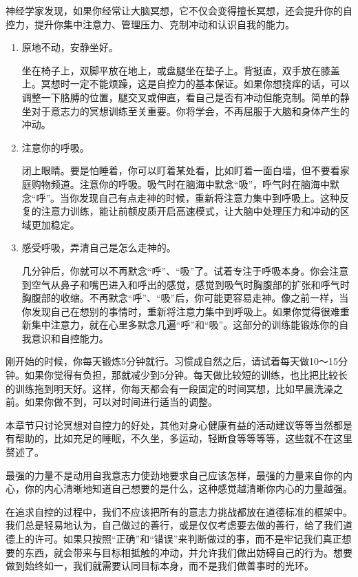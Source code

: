 \documentclass[12pt,oneside]{book}
\begin{document}
\begin{bookref}[frametitle={\cite{自控力}}]
神经学家发现，如果你经常让大脑冥想，它不仅会变得擅长冥想，还会提升你的自控力，提升你集中注意力、管理压力、克制冲动和认识自我的能力。

\begin{enumerate}
\item 原地不动，安静坐好。

坐在椅子上，双脚平放在地上，或盘腿坐在垫子上。背挺直，双手放在膝盖上。冥想时一定不能烦躁，这是自控力的基本保证。如果你想挠痒的话，可以调整一下胳膊的位置，腿交叉或伸直，看自己是否有冲动但能克制。简单的静坐对于意志力的冥想训练至关重要。你将学会，不再屈服于大脑和身体产生的冲动。

\item 注意你的呼吸。

闭上眼睛。要是怕睡着，你可以盯着某处看，比如盯着一面白墙，但不要看家庭购物频道。注意你的呼吸。吸气时在脑海中默念“吸”，呼气时在脑海中默念“呼”。当你发现自己有点走神的时候，重新将注意力集中到呼吸上。这种反复的注意力训练，能让前额皮质开启高速模式，让大脑中处理压力和冲动的区域更加稳定。

\item 感受呼吸，弄清自己是怎么走神的。

几分钟后，你就可以不再默念“呼”、“吸”了。试着专注于呼吸本身。你会注意到空气从鼻子和嘴巴进入和呼出的感觉，感觉到吸气时胸腹部的扩张和呼气时胸腹部的收缩。不再默念“呼”、“吸”后，你可能更容易走神。像之前一样，当你发现自己在想别的事情时，重新将注意力集中到呼吸上。如果你觉得很难重新集中注意力，就在心里多默念几遍“呼”和“吸”。这部分的训练能锻炼你的自我意识和自控能力。
\end{enumerate}


刚开始的时候，你每天锻炼5分钟就行。习惯成自然之后，请试着每天做10～15分钟。如果你觉得有负担，那就减少到5分钟。每天做比较短的训练，也比把比较长的训练拖到明天好。这样，你每天都会有一段固定的时间冥想，比如早晨洗澡之前。如果你做不到，可以对时间进行适当的调整。

\end{bookref}

本章节只讨论冥想对自控力的好处，其他对身心健康有益的活动建议等等当然都是有帮助的，比如充足的睡眠，不久坐，多运动，轻断食等等等等，这些就不在这里赘述了。


最强的力量不是动用自我意志力使劲地要求自己应该怎样，最强的力量来自你的内心，你的内心清晰地知道自己想要的是什么，这种感觉越清晰你内心的力量越强。

在追求自控的过程中，我们不应该把所有的意志力挑战都放在道德标准的框架中。我们总是轻易地认为，自己做过的善行，或是仅仅考虑要去做的善行，给了我们道德上的许可。如果只按照“正确”和“错误”来判断做过的事，而不是牢记我们真正想要的东西，就会带来与目标相抵触的冲动，并允许我们做出妨碍自己的行为。想要做到始终如一，我们就需要认同目标本身，而不是我们做善事时的光环。
\end{document}
